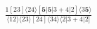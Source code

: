 \documentclass[varwidth, border=5pt]{standalone}
\begin{document}
\begin{my}
$\begin{gathered}
\scriptscriptstyle\frac{1[23]⟨24⟩[𝟓|𝟓|3+4|2]⟨3𝟓⟩}{⟨12⟩⟨23⟩[24]⟨34⟩⟨2|3+4|2]}
\end{gathered}$
\end{my}
\end{document}
